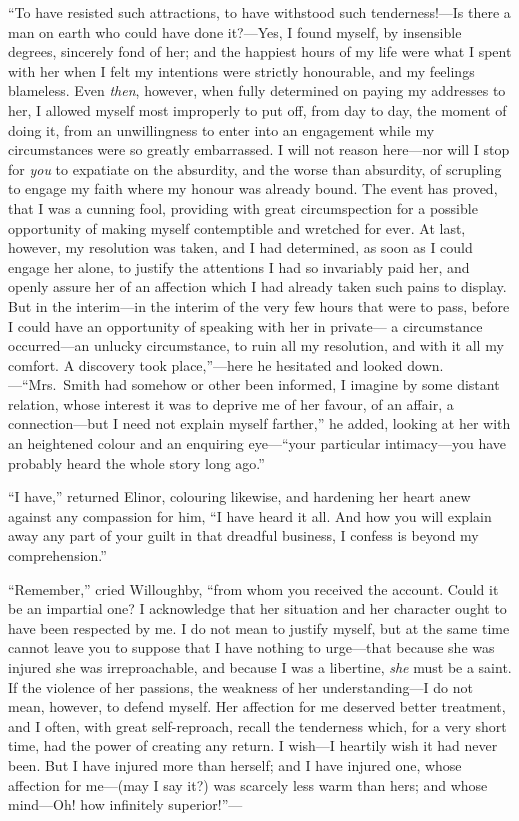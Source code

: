 ``To have resisted such attractions, to have withstood
such tenderness!---Is there a man on earth who could have
done it?---Yes, I found myself, by insensible degrees,
sincerely fond of her; and the happiest hours of my life
were what I spent with her when I felt my intentions
were strictly honourable, and my feelings blameless.
Even \emph{then}, however, when fully determined on paying
my addresses to her, I allowed myself most improperly
to put off, from day to day, the moment of doing it,
from an unwillingness to enter into an engagement
while my circumstances were so greatly embarrassed.
I will not reason here---nor will I stop for \emph{you} to expatiate
on the absurdity, and the worse than absurdity, of scrupling
to engage my faith where my honour was already bound.
The event has proved, that I was a cunning fool,
providing with great circumspection for a possible
opportunity of making myself contemptible and wretched
for ever.  At last, however, my resolution was taken,
and I had determined, as soon as I could engage her alone,
to justify the attentions I had so invariably paid her,
and openly assure her of an affection which I had already
taken such pains to display.  But in the interim---in the
interim of the very few hours that were to pass, before I
could have an opportunity of speaking with her in private---%
a circumstance occurred---an unlucky circumstance, to ruin
all my resolution, and with it all my comfort.  A discovery
took place,''---here he hesitated and looked down.---``Mrs.\ Smith
had somehow or other been informed, I imagine by some
distant relation, whose interest it was to deprive me of
her favour, of an affair, a connection---but I need not
explain myself farther,'' he added, looking at her with an
heightened colour and an enquiring eye---``your particular
intimacy---you have probably heard the whole story long ago.''

``I have,'' returned Elinor, colouring likewise,
and hardening her heart anew against any compassion for him,
``I have heard it all.  And how you will explain away any
part of your guilt in that dreadful business, I confess
is beyond my comprehension.''

``Remember,'' cried Willoughby, ``from whom you received
the account.  Could it be an impartial one?  I acknowledge
that her situation and her character ought to have been
respected by me.  I do not mean to justify myself, but at
the same time cannot leave you to suppose that I have nothing
to urge---that because she was injured she was irreproachable,
and because I was a libertine, \emph{she} must be a saint.
If the violence of her passions, the weakness of her
understanding---I do not mean, however, to defend myself.
Her affection for me deserved better treatment, and I often,
with great self-reproach, recall the tenderness which,
for a very short time, had the power of creating any return.
I wish---I heartily wish it had never been.  But I have injured
more than herself; and I have injured one, whose affection
for me---(may I say it?) was scarcely less warm than hers;
and whose mind---Oh! how infinitely superior!''---%


